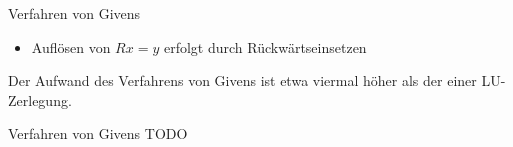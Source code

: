 \begin{defi}{Verfahren von Givens}
\begin{itemize}
\begin{itemize}
\[                            y = Q^Tb =  Q_{n-1} \cdot \ldots \cdot Q_1 b = Q_{nn-1} \cdot \ldots \cdot Q_{21} b
                        \]
                  \item betrachte $\rho_{ij}$ in Eliminationsreihenfolge und rekonstruiere $Q_{ij}$ über
                        \[
                            s = \rho_{ij}, \quad c = \sqrt{1 - s^2}
                        \]
                  \item führe Matrix-Vektor-Produkte aus\footnote{Dabei verändert $Q_{ij} v$, $v \in \R^n$ nur $v_i$ und $v_j$.}
              \end{itemize}
        \item Auflösen von $Rx = y$ erfolgt durch Rückwärtseinsetzen
    \end{itemize}
    
    Der Aufwand des Verfahrens von Givens ist etwa viermal höher als der einer LU-Zerlegung.
\end{defi}

\begin{example}{Verfahren von Givens}
    TODO
\end{example}

